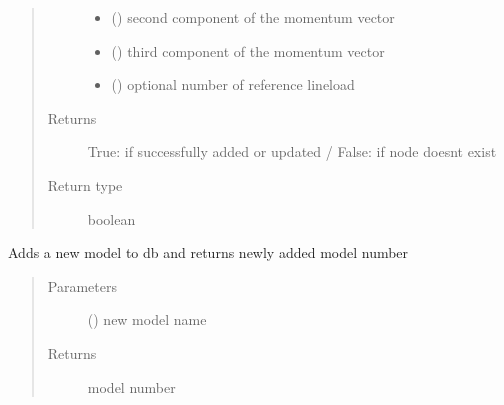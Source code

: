 \documentclass[letterpaper,10pt,english]{sphinxmanual}
\begin{document}
\begin{fulllineitems}
\begin{fulllineitems}
\begin{quote}
\begin{description}
\begin{itemize}
\item {} 
 () \textendash{} second component of the momentum vector

\item {} 
 () \textendash{} third component of the momentum vector

\item {} 
 () \textendash{} optional number of reference lineload

\end{itemize}

\item[{Returns}] \leavevmode
True: if successfully added or updated / False: if node doesnt exist

\item[{Return type}] \leavevmode
boolean

\end{description}\end{quote}

\end{fulllineitems}


\begin{fulllineitems}
\label{\detokenize{api:beamon.database.database.Database.add_model}}
Adds a new model to db and returns newly added model number
\begin{quote}\begin{description}
\item[{Parameters}] \leavevmode
{} () \textendash{} new model name

\item[{Returns}] \leavevmode
model number


\end{description}
\end{quote}
\end{fulllineitems}
\end{fulllineitems}
\end{document}

